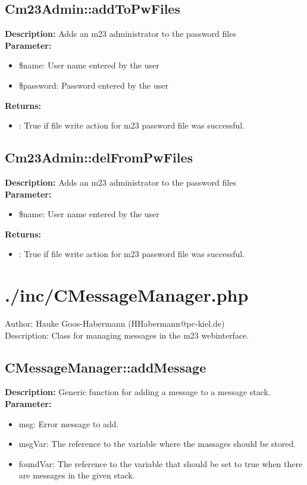 \subsection{Cm23Admin::addToPwFiles}
\textbf{Description:} Adds an m23 administrator to the password files\\
\textbf{Parameter:}
\begin{itemize}
\item \$name: User name entered by the user
\item \$password: Password entered by the user
\end{itemize}
\textbf{Returns:}
\begin{itemize}
\item : True if file write action for m23 password file was successful.
\end{itemize}

\subsection{Cm23Admin::delFromPwFiles}
\textbf{Description:} Adds an m23 administrator to the password files\\
\textbf{Parameter:}
\begin{itemize}
\item \$name: User name entered by the user
\end{itemize}
\textbf{Returns:}
\begin{itemize}
\item : True if file write action for m23 password file was successful.
\end{itemize}

\newpage\section{./inc/CMessageManager.php}
 Author: Hauke Goos-Habermann (HHabermann@pc-kiel.de)\\
 Description: Class for managing messages in the m23 webinterface.\\

\subsection{CMessageManager::addMessage}
\textbf{Description:} Generic function for adding a message to a message stack.\\
\textbf{Parameter:}
\begin{itemize}
\item msg: Error message to add.
\item msgVar: The reference to the variable where the massages should be stored.
\item foundVar: The reference to the variable that should be set to true when there are messages in the given stack.
\end{itemize}

